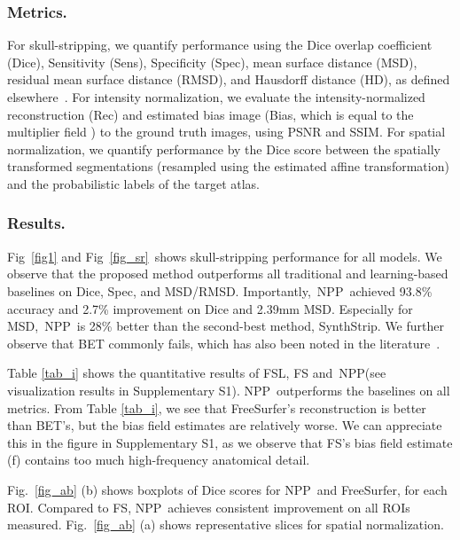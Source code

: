 \documentclass[runningheads]{llncs}
\newcommand{\modelname}{NPP}
\begin{document}
\subsubsection{Metrics.}
For skull-stripping, we quantify performance using the Dice overlap coefficient (Dice), Sensitivity (Sens), Specificity (Spec), mean surface distance (MSD), residual mean surface distance (RMSD), and Hausdorff distance (HD), as defined elsewhere~\cite{jadon2020survey}.
For intensity normalization, we evaluate the intensity-normalized reconstruction (Rec) and estimated bias image (Bias, which is equal to the multiplier field ) to the ground truth images, using PSNR and SSIM. 
For spatial normalization, we quantify performance by the Dice score between the spatially transformed segmentations (resampled using the estimated affine transformation) and the probabilistic labels of the target atlas.

\subsubsection{Results.}
Fig~\ref{fig1} and Fig~\ref{fig_sr}~shows skull-stripping performance for all models. 
We observe that the proposed method outperforms all traditional and learning-based baselines on Dice, Spec, and MSD/RMSD. 
Importantly,~\modelname~achieved 93.8\% accuracy and 2.7\% improvement on Dice and 2.39mm MSD.
Especially for MSD,~\modelname~is 28\% better than the second-best method, SynthStrip. 
We further observe that BET commonly fails, which has also been noted in the literature~\cite{ezhilarasan2021automatic}.

Table \ref{tab_i} shows the quantitative results of FSL, FS and~\modelname (see visualization results in Supplementary S1). 
\modelname~outperforms the baselines on all metrics. 
From Table \ref{tab_i}, we see that FreeSurfer's reconstruction is better than BET's, but the bias field estimates are relatively worse. 
We can appreciate this in the figure in Supplementary S1, as we observe that FS's bias field estimate (f) contains too much high-frequency anatomical detail.

Fig.~\ref{fig_ab} (b) shows boxplots of Dice scores for \modelname~and FreeSurfer, for each ROI. Compared to FS,  
\modelname~achieves consistent improvement on all ROIs measured. Fig.~\ref{fig_ab} (a) shows representative slices for spatial normalization.


 
\end{document}
